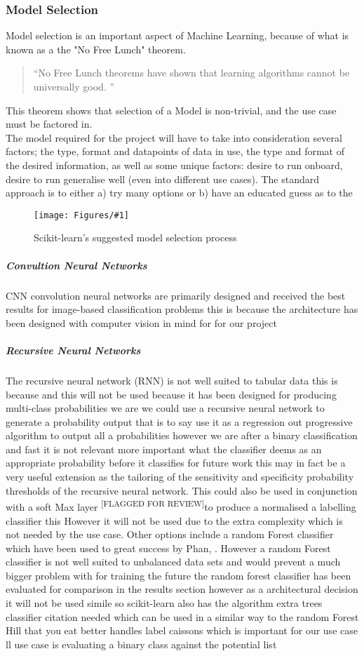 \documentclass{UoNMCHA}
\newcommand{\flagforreview}{\textsuperscript{\color{red} [FLAGGED FOR REVIEW]}}
\newcommand{\inlineQuote}[1]{``#1''}
\newcommand{\fancyquote}[1]{\begin{quotation}\inlineQuote{#1}\end{quotation}}
\newcommand{\fFigure}[3]{
	\begin{figure}[h]
        \begin{center}  
            \texttt{[image: Figures/\#1]}  
            \caption{#2}
            \label{#1}
        \end{center}
	\end{figure}
}
\numberwithin{equation}{section}
\begin{document}
\subsubsection{Model Selection}
Model selection is an important aspect of Machine Learning, because of what is known as a the "No Free Lunch" theorem. 
\fancyquote{No Free Lunch theorems have shown that learning algorithms cannot be universally good. \cite{NFL_quote}}
This theorem shows that selection of a Model is non-trivial, and the use case must be factored in.\\

The model required for the project will have to take into consideration several factors; the type, format and datapoints of data in use, the type and format of the desired information, as well as some unique factors: desire to run onboard, desire to run generalise well (even into different use cases). The standard approach is to either a) try many options or b) have an educated guess as to the 

\fFigure{modelselection.png}{Scikit-learn's suggested model selection process}{0.8}


\subparagraph{Convultion Neural Networks}
CNN convolution neural networks are primarily designed and received the best results for image-based classification problems this is because the architecture has been designed with computer vision in mind for for our project

\subparagraph{Recursive Neural Networks}
The recursive neural network (RNN) is not well suited to tabular data this is because and this will not be used because it has been designed for producing multi-class probabilities we are we could use a recursive neural network to generate a probability output that is to say use it as a regression out progressive algorithm to output all a probabilities however we are after a binary classification and fast it is not relevant more important what the classifier deems as an appropriate probability before it classifies for future work this may in fact be a very useful extension as the tailoring of the sensitivity and specificity probability thresholds of the recursive neural network. This could also be used in conjunction with a soft Max layer\flagforreview to produce a normalised a labelling classifier this
However it will not be used due to the extra complexity which is not needed by the use case. Other options include a random Forest classifier which have been used to great success by Phan, \cite{Phan2015}. However a random Forest classifier is not well suited to unbalanced data sets and would prevent a much bigger problem with for training the future the random forest classifier has been evaluated for comparison in the results section however as a architectural decision it will not be used simile so scikit-learn also has the algorithm extra trees classifier citation needed which can be used in a similar way to the random Forest Hill that you eat better handles label caissons which is important for our use case ll use case is evaluating a binary class against the potential list
\end{document}
